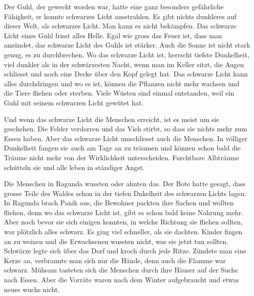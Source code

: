 \begin{swb}
Der Guhl, der geweckt worden war, hatte eine ganz besonders gefährliche Fähigkeit, er konnte schwarzes Licht ausstrahlen. Es gibt nichts dunkleres auf dieser Welt, als schwarzes Licht. Man kann es nicht bekämpfen. Das schwarze Licht eines Guhl frisst alles Helle. Egal wie gross das Feuer ist, dass man anzündet, das schwarze Licht des Guhls ist stärker. Auch die Sonne ist nicht stark genug, es zu durchbrechen. Wo das schwarze Licht ist, herrscht tiefste Dunkelheit, viel dunkler als in der schwärzesten Nacht, wenn man im Keller sitzt, die Augen schliesst und noch eine Decke über den Kopf gelegt hat. Das schwarze Licht kann alles durchdringen und wo es ist, können die Pflanzen nicht mehr wachsen und die Tiere fliehen oder sterben. Viele Wüsten sind einmal entstanden, weil ein Guhl mit seinem schwarzen Licht gewütet hat. 

Und wenn das schwarze Licht die Menschen erreicht, ist es meist um sie geschehen. Die Felder verdorren und das Vieh stirbt, so dass sie nichts mehr zum Essen haben. Aber das schwarze Licht umschliesst auch die Menschen. In völliger Dunkelheit fangen sie auch am Tage an zu träumen und können schon bald die Träume nicht mehr von der Wirklichkeit unterscheiden. Furchtbare Albträume schütteln sie und alle leben in ständiger Angst.


Die Menschen in Ragunda wussten oder ahnten das. Der Bote hatte gesagt, dass grosse Teile des Waldes schon in der tiefen Dnkelheit des schwarzen Lichts lagen. In Ragunda brach Panik aus, die Bewohner packten ihre Sachen und wollten fliehen, denn wo das schwarze Licht ist, gibt es schon bald keine Nahrung mehr. Aber noch bevor sie sich einigen konnten, in welche Richtung sie fliehen sollten, war plötzlich alles schwarz. Es ging viel schneller, als sie dachten. Kinder fingen an zu weinen und die Erwachsenen wussten nicht, was sie jetzt tun sollten. Schwärze legte sich über das Dorf und kroch durch jede Ritze. Zündete man eine Kerze an, verbrannte man sich nur die Hände, denn auch die Flamme war schwarz. Mühsam tasteten sich die Menschen durch ihre Häuser auf der Suche nach Essen. Aber die Vorräte waren nach dem Winter aufgebraucht und etwas neues wuchs nicht.


\end{swb}
